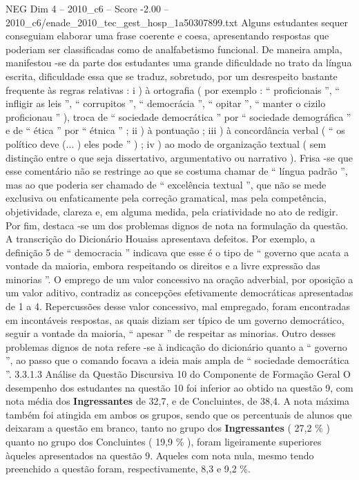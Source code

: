 \begin{textsample}{NEG Dim 4 – 2010\_c6 – Score -2.00 – 2010\_c6/enade\_2010\_tec\_gest\_hosp\_1a50307899.txt}
Alguns estudantes sequer conseguiam elaborar uma frase coerente e coesa, apresentando respostas que poderiam ser classificadas como de analfabetismo funcional.
De maneira ampla, manifestou -se da parte dos estudantes uma grande dificuldade no trato da língua escrita, dificuldade essa que se traduz, sobretudo, por um desrespeito bastante frequente às regras relativas : i ) à ortografia ( por exemplo : “ proficionais ”, “ infligir as leis ”, “ corrupitos ”, “ democrácia ”, “ opitar ”, “ manter o cizilo proficionau ” ), troca de “ sociedade democrática ” por “ sociedade demográfica ” e de “ ética ” por “ étnica ” ; ii ) à pontuação ; iii ) à concordância verbal ( “ os político deve (... ) eles pode ” ) ; iv ) ao modo de organização textual ( sem distinção entre o que seja dissertativo, argumentativo ou narrativo ).
Frisa -se que esse comentário não se restringe ao que se costuma chamar de “ língua padrão ”, mas ao que poderia ser chamado de “ excelência textual ”, que não se mede exclusiva ou enfaticamente pela correção gramatical, mas pela competência, objetividade, clareza e, em alguma medida, pela criatividade no ato de redigir.
Por fim, destaca -se um dos problemas dignos de nota na formulação da questão.
A transcrição do Dicionário Houaiss apresentava defeitos.
Por exemplo, a definição 5 de “ democracia ” indicava que esse é o tipo de “ governo que acata a vontade da maioria, embora respeitando os direitos e a livre expressão das minorias ”.
O emprego de um valor concessivo na oração adverbial, por oposição a um valor aditivo, contradiz as concepções efetivamente democráticas apresentadas de 1 a 4.
Repercussões desse valor concessivo, mal empregado, foram encontradas em incontáveis respostas, as quais diziam ser típico de um governo democrático, seguir a vontade da maioria, “ apesar ” de respeitar as minorias.
Outro desses problemas dignos de nota refere -se à indicação do dicionário quanto a “ governo ”, ao passo que o comando focava a ideia mais ampla de “ sociedade democrática ”. 3.3.1.3 Análise da Questão Discursiva 10 do Componente de Formação Geral O desempenho dos estudantes na questão 10 foi inferior ao obtido na questão 9, com nota média dos \textbf{Ingressantes} de 32,7, e de Concluintes, de 38,4.
A nota máxima também foi atingida em ambos os grupos, sendo que os percentuais de alunos que deixaram a questão em branco, tanto no grupo dos \textbf{Ingressantes} ( 27,2 \% ) quanto no grupo dos Concluintes ( 19,9 \% ), foram ligeiramente superiores àqueles apresentados na questão 9.
Aqueles com nota nula, mesmo tendo preenchido a questão foram, respectivamente, 8,3 e 9,2 \%.

\end{textsample}

